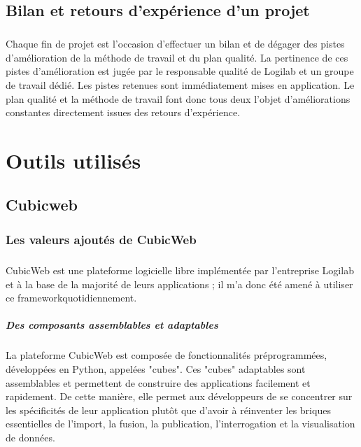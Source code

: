 \documentclass {report}
\begin{document}

\section{Bilan et retours d'expérience d'un projet}
\paragraph{}
Chaque fin de projet est l’occasion d’effectuer un bilan et de dégager des pistes d’amélioration de la méthode de travail et du plan qualité. La pertinence de ces pistes d’amélioration est jugée par le responsable qualité de Logilab et un groupe de travail dédié. Les pistes retenues sont immédiatement mises en application. Le plan qualité et la méthode de travail font donc tous deux l’objet d’améliorations constantes directement issues des retours d’expérience.

\chapter{Outils utilisés}
\section{Cubicweb}
\subsection{Les valeurs ajoutés de CubicWeb}
\paragraph{}
CubicWeb est une plateforme logicielle libre implémentée par l'entreprise Logilab et à la base de la majorité de leurs applications ; il m'a donc été amené à utiliser ce framework\footnotemark[1] quotidiennement.



\paragraph{Des composants assemblables et adaptables}
La plateforme CubicWeb est composée de fonctionnalités préprogrammées, développées en Python, appelées "cubes". Ces "cubes" adaptables sont assemblables et permettent de construire des applications facilement et rapidement. De cette manière, elle permet aux développeurs de se concentrer sur les spécificités de leur application plutôt que d'avoir à réinventer les briques essentielles de l'import, la fusion, la publication, l'interrogation et la visualisation de données. 
\end{document}

